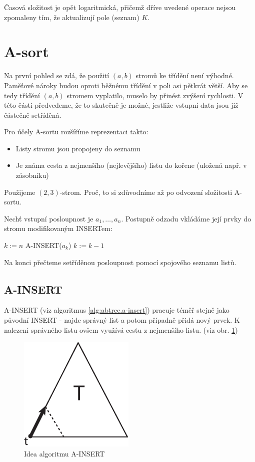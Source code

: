 Časová složitost je opět logaritmická, přičemž dříve uvedené operace
nejsou zpomaleny tím, že aktualizují pole (seznam) $K$.

\section{A-sort}

Na první pohled se zdá, že použití $(a,b)$ stromů ke třídění není
výhodné. Paměťové nároky budou oproti běžnému třídění v poli asi
pětkrát větší. Aby se tedy třídění $(a,b)$ stromem vyplatilo, muselo
by přinést zvýšení rychlosti. V této části předvedeme, že to skutečně
je možné, jestliže vstupní data jsou již částečně setříděná.

Pro účely A-sortu rozšíříme reprezentaci takto:
\begin{itemize}
\item Listy stromu jsou propojeny do seznamu
\item Je známa cesta z nejmenšího (nejlevějšího) listu do kořene
(uložená např. v zásobníku)
\end{itemize}

Použijeme $(2,3)$-strom. Proč, to si zdůvodníme až po odvození složitosti
A-sortu.

Nechť vstupní posloupnost je $a_1, \dots, a_n$. Postupně odzadu
vkládáme její prvky do stromu modifikovaným INSERTem:

\begin{algorithmic}
\STATE $k := n$
	\STATE A-INSERT($a_k$)
	\STATE $k := k - 1$
\ENDWHILE
\end{algorithmic}

Na konci přečteme setříděnou posloupnost pomocí spojového seznamu
listů.

\subsection{A-INSERT}

A-INSERT (viz algoritmus \ref{alg:abtree.a-insert}) pracuje
téměř stejně jako původní INSERT - najde správný list a potom
případně přidá nový prvek. K nalezení správného listu ovšem využívá
cestu z nejmenšího listu. (viz obr. \ref{fig:abtree.a-insert})

\begin{figure} 
\centering\includegraphics{pics/a-insert}
\caption{Idea algoritmu A-INSERT}
\label{fig:abtree.a-insert}
\end{figure}

